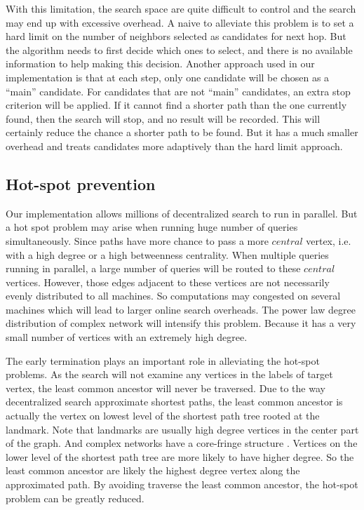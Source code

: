 With this limitation, the search space are quite difficult to control and the search may end up with excessive overhead. A naive to alleviate this problem is to set a hard limit on the number of neighbors selected as candidates for next hop. But the algorithm needs to first decide which ones to select, and there is no available information to help making this decision. Another approach used in our implementation is that at each step, only one candidate will be chosen as a ``main'' candidate. For candidates that are not ``main'' candidates, an extra stop criterion will be applied. If it cannot find a shorter path than the one currently found, then the search will stop, and no result will be recorded. This will certainly reduce the chance a shorter path to be found. But it has a much smaller overhead and treats candidates more adaptively than the hard limit approach.

\subsection{Hot-spot prevention}

Our implementation allows millions of decentralized search to run in parallel. But a hot spot problem may arise when running huge number of queries simultaneously. Since paths have more chance to pass a more $central$ vertex, i.e. with a high degree or a high betweenness centrality. When multiple queries running in parallel, a large number of queries will be routed to these $central$ vertices. However, those edges adjacent to these vertices are not necessarily evenly distributed to all machines. So computations may congested on several machines which will lead to larger online search overheads. The power law degree distribution of complex network will intensify this problem. Because it has a very small number of vertices with an extremely high degree. 

The early termination plays an important role in alleviating the hot-spot problems. As the search will not examine any vertices in the labels of target vertex, the least common ancestor will never be traversed. Due to the way decentralized search approximate shortest paths, the least common ancestor is actually the vertex on lowest level of the shortest path tree rooted at the landmark. Note that landmarks are usually high degree vertices in the center part of the graph. And complex networks have a core-fringe structure \cite{callaway2000network}. Vertices on the lower level of the shortest path tree are more likely to have higher degree. So the least common ancestor are likely the highest degree vertex along the approximated path. By avoiding traverse the least common ancestor, the hot-spot problem can be greatly reduced.